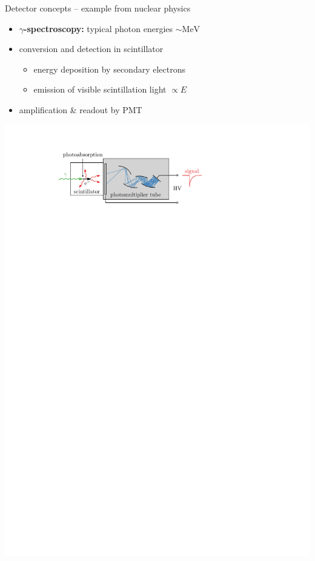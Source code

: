 \documentclass[11pt,xcolor=dvipsnames,professionalfonts]{beamer}
\begin{document}
\begin{frame}{Detector concepts -- example from nuclear physics}
	\begin{itemize}
		\setlength\itemsep{1em}
		\item \textbf{\boldmath$\gamma$-spectroscopy:} typical photon energies $\sim \mathrm{MeV}$
		
		\item conversion and detection in scintillator
		\begin{itemize}
			\item energy deposition by secondary electrons
			\item emission of visible scintillation light $ \propto E$
		\end{itemize}
		
		\item amplification \& readout by PMT
	\end{itemize}
	\vfill
	\begin{center}
		\includegraphics{./figures/scintillation_counter.pdf}
	\end{center}
\end{frame}
\end{document}
